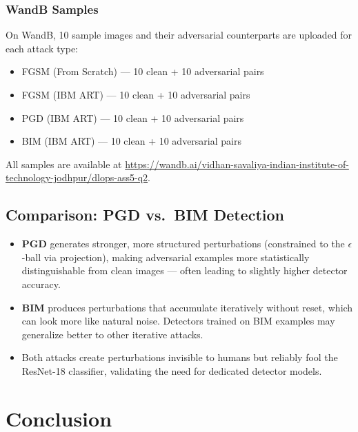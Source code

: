 \documentclass[11pt,a4paper]{article}
\begin{document}
\subsubsection{WandB Samples}

On WandB, 10 sample images and their adversarial counterparts are uploaded for each attack type:
\begin{itemize}
  \item FGSM (From Scratch) — 10 clean + 10 adversarial pairs
  \item FGSM (IBM ART) — 10 clean + 10 adversarial pairs
  \item PGD (IBM ART) — 10 clean + 10 adversarial pairs
  \item BIM (IBM ART) — 10 clean + 10 adversarial pairs
\end{itemize}
All samples are available at \url{https://wandb.ai/vidhan-savaliya-indian-institute-of-technology-jodhpur/dlops-ass5-q2}.

\subsection{Comparison: PGD vs.\ BIM Detection}

\begin{itemize}
  \item \textbf{PGD} generates stronger, more structured perturbations (constrained to the $\epsilon$-ball via projection), making adversarial examples more statistically distinguishable from clean images — often leading to slightly higher detector accuracy.
  \item \textbf{BIM} produces perturbations that accumulate iteratively without reset, which can look more like natural noise. Detectors trained on BIM examples may generalize better to other iterative attacks.
  \item Both attacks create perturbations invisible to humans but reliably fool the ResNet-18 classifier, validating the need for dedicated detector models.
\end{itemize}

\newpage

\section{Conclusion}
\end{document}
